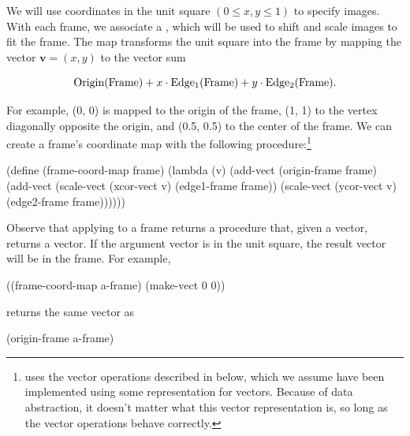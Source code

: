 We will use coordinates in the unit square \( (0 \le x, y \le 1) \) to specify
images.  With each frame, we associate a , which
will be used to shift and scale images to fit the frame.  The map transforms
the unit square into the frame by mapping the vector \( \mathbf{v} = (x, y) \) to
the vector sum

$$ {\rm Origin(Frame)} + x \cdot {\rm Edge_1(Frame)} + y \cdot {\rm Edge_2(Frame)}. $$

\noindent
For example, (0, 0) is mapped to the origin of the frame, (1, 1) to the vertex
diagonally opposite the origin, and (0.5, 0.5) to the center of the frame.  We
can create a frame's coordinate map with the following
procedure:\footnote{ uses the vector operations described
in  below, which we assume have been implemented using some
representation for vectors.  Because of data abstraction, it doesn't matter
what this vector representation is, so long as the vector operations behave
correctly.}

\begin{codeBlock}
(define (frame-coord-map frame)
  (lambda (v)
    (add-vect
     (origin-frame frame)
     (add-vect (scale-vect (xcor-vect v)
                           (edge1-frame frame))
               (scale-vect (ycor-vect v)
                           (edge2-frame frame))))))
\end{codeBlock}

\noindent
Observe that applying  to a frame returns a procedure
that, given a vector, returns a vector.  If the argument vector is in the unit
square, the result vector will be in the frame.  For example,

\begin{codeBlock}
((frame-coord-map a-frame) (make-vect 0 0))
\end{codeBlock}

\noindent
returns the same vector as

\begin{codeBlock}
(origin-frame a-frame)
\end{codeBlock}


